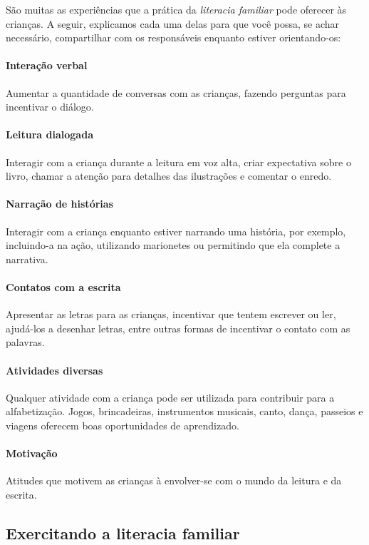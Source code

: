 \documentclass[11pt]{extarticle}
\begin{document}
São muitas as experiências que a prática da \textit{literacia familiar} 
pode oferecer às crianças. A seguir, explicamos cada uma delas para que você possa, 
se achar necessário, compartilhar com os responsáveis enquanto estiver orientando-os: 

\paragraph{Interação verbal} Aumentar a quantidade de conversas com as 
crianças, fazendo perguntas para incentivar o diálogo.

\paragraph{Leitura dialogada} Interagir com a criança durante a leitura 
em voz alta, criar expectativa sobre o livro, chamar a atenção para detalhes 
das ilustrações e comentar o enredo.

\paragraph{Narração de histórias} Interagir com a criança enquanto 
estiver narrando uma história, por exemplo, incluindo-a na ação, utilizando 
marionetes ou permitindo que ela complete a narrativa.

\paragraph{Contatos com a escrita} Apresentar as letras para as 
crianças, incentivar que tentem escrever ou ler, ajudá-los a desenhar letras, 
entre outras formas de incentivar o contato com as palavras.

\paragraph{Atividades diversas} Qualquer atividade com a criança 
pode ser utilizada para contribuir para a alfabetização. Jogos, brincadeiras, 
instrumentos musicais, canto, dança, passeios e viagens oferecem boas 
oportunidades de aprendizado.

\paragraph{Motivação} Atitudes que motivem as crianças à envolver-se com 
o mundo da leitura e da escrita.

\subsection{Exercitando a literacia familiar}
\end{document}
